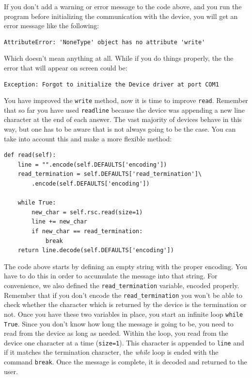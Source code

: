 If you don't add a warning or error message to the code above, and you run
the program before initializing the communication with the device, you
will get an error message like the following:

\begin{verbatim}
AttributeError: 'NoneType' object has no attribute 'write'
\end{verbatim}

Which doesn't mean anything at all. While if you do things properly, the
the error that will appear on screen could be:

\begin{verbatim}
Exception: Forgot to initialize the Device driver at port COM1
\end{verbatim}

You have improved the \texttt{write} method, now it is time to improve
\texttt{read}. Remember that so far you have used \texttt{readline}
because the device was appending a new line character at the end of each
answer. The vast majority of devices behave in this way, but one has to
be aware that is not always going to be the case. You can take into
account this and make a more flexible method:

\begin{verbatim}
def read(self):
    line = "".encode(self.DEFAULTS['encoding'])
    read_termination = self.DEFAULTS['read_termination']\
        .encode(self.DEFAULTS['encoding'])
    
    while True:
        new_char = self.rsc.read(size=1)
        line += new_char
        if new_char == read_termination:
            break
    return line.decode(self.DEFAULTS['encoding'])
\end{verbatim}

The code above starts by defining an empty string with the proper
encoding. You have to do this in order to accumulate the message into
that string. For convenience, we also defined the
\texttt{read_termination} variable, encoded properly. Remember that if you don't encode the \texttt{read_termination} you won't be able to check whether the character which is returned by the device is the termination or not. Once you have these two variables in place, you start an infinite loop \texttt{while True}. Since you don't know how long the message is going to be, you need to read from the device as long as needed. Within the loop, you read from the device one character at a time (\texttt{size=1}). This character is appended to \texttt{line} and if it matches the termination character, the \emph{while} loop is ended with the command \texttt{break}. Once the message is
complete, it is decoded and returned to the user.

